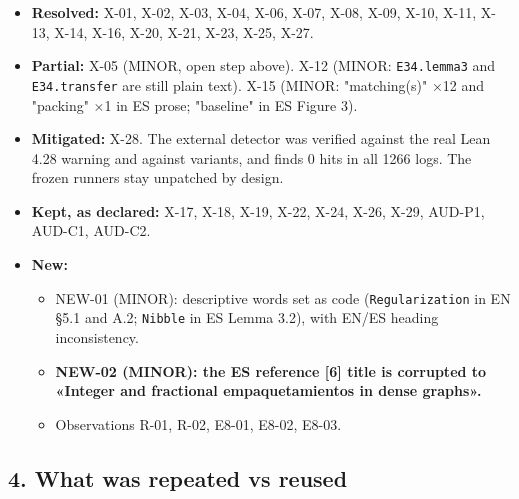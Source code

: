 \documentclass[
]{article}
\providecommand{\tightlist}{%
  \setlength{\itemsep}{0pt}\setlength{\parskip}{0pt}}
\begin{document}
\begin{itemize}
\tightlist
\item
  \textbf{Resolved:} X-01, X-02, X-03, X-04, X-06, X-07, X-08, X-09,
  X-10, X-11, X-13, X-14, X-16, X-20, X-21, X-23, X-25, X-27.
\item
  \textbf{Partial:} X-05 (MINOR, open step above). X-12 (MINOR:
  \texttt{E34.lemma3} and \texttt{E34.transfer} are still plain text).
  X-15 (MINOR: "matching(s)" ×12 and "packing" ×1 in ES prose;
  "baseline" in ES Figure 3).
\item
  \textbf{Mitigated:} X-28. The external detector was verified against
  the real Lean 4.28 warning and against variants, and finds 0 hits in
  all 1266 logs. The frozen runners stay unpatched by design.
\item
  \textbf{Kept, as declared:} X-17, X-18, X-19, X-22, X-24, X-26, X-29,
  AUD-P1, AUD-C1, AUD-C2.
\item
  \textbf{New:}

  \begin{itemize}
  \tightlist
  \item
    NEW-01 (MINOR): descriptive words set as code
    (\texttt{Regularization} in EN §5.1 and A.2; \texttt{Nibble} in ES
    Lemma 3.2), with EN/ES heading inconsistency.
  \item
    \textbf{NEW-02 (MINOR): the ES reference {[}6{]} title is corrupted
    to «Integer and fractional empaquetamientos in dense graphs».}
  \item
    Observations R-01, R-02, E8-01, E8-02, E8-03.
  \end{itemize}
\end{itemize}

\subsection{4. What was repeated vs
reused}\label{4-what-was-repeated-vs-reused}
\end{document}
